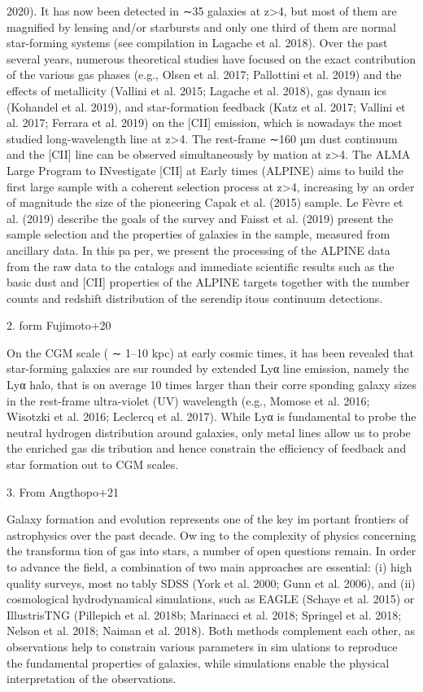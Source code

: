 2020). It has now been detected in ∼35 galaxies at z>4, but most
of them are magnified by lensing and/or starbursts and only one
third of them are normal star-forming systems (see compilation
in Lagache et al. 2018).
Over the past several years, numerous theoretical studies
have focused on the exact contribution of the various gas phases
(e.g., Olsen et al. 2017; Pallottini et al. 2019) and the effects of
metallicity (Vallini et al. 2015; Lagache et al. 2018), gas dynamics (Kohandel et al. 2019), and star-formation feedback (Katz
et al. 2017; Vallini et al. 2017; Ferrara et al. 2019) on the [CII]
emission, which is nowadays the most studied long-wavelength
line at z>4.
The rest-frame ∼160 µm dust continuum and the [CII] line
can be observed simultaneously by mation at z>4. The ALMA Large Program to INvestigate [CII] at
Early times (ALPINE) aims to build the first large sample with
a coherent selection process at z>4, increasing by an order of
magnitude the size of the pioneering Capak et al. (2015) sample.
Le Fèvre et al. (2019) describe the goals of the survey and Faisst
et al. (2019) present the sample selection and the properties of
galaxies in the sample, measured from ancillary data. In this paper, we present the processing of the ALPINE data from the raw
data to the catalogs and immediate scientific results such as the
basic dust and [CII] properties of the ALPINE targets together
with the number counts and redshift distribution of the serendipitous continuum detections.



2. form Fujimoto+20

On the CGM scale ( ∼ 1–10 kpc) at early cosmic times,
it has been revealed that star-forming galaxies are surrounded by extended Lyα line emission, namely the Lyα
halo, that is on average 10 times larger than their corresponding galaxy sizes in the rest-frame ultra-violet (UV)
wavelength (e.g., Momose et al. 2016; Wisotzki et al.
2016; Leclercq et al. 2017). While Lyα is fundamental to
probe the neutral hydrogen distribution around galaxies,
only metal lines allow us to probe the enriched gas distribution and hence constrain the efficiency of feedback
and star formation out to CGM scales.



3. From Angthopo+21

Galaxy formation and evolution represents one of the key important frontiers of astrophysics over the past decade. Owing to the complexity of physics concerning the transformation of gas into stars, a number of open questions remain.
In order to advance the field, a combination of two main
approaches are essential: (i) high quality surveys, most notably SDSS (York et al. 2000; Gunn et al. 2006), and (ii)
cosmological hydrodynamical simulations, such as EAGLE
(Schaye et al. 2015) or IllustrisTNG (Pillepich et al. 2018b;
Marinacci et al. 2018; Springel et al. 2018; Nelson et al. 2018;
Naiman et al. 2018). Both methods complement each other,
as observations help to constrain various parameters in simulations to reproduce the fundamental properties of galaxies,
while simulations enable the physical interpretation of the
observations.


